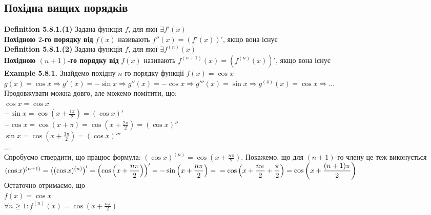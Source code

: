 \documentclass[a4paper, 14pt]{extarticle}
\def\huge{\displaystyle}
\def\bigline{\vspace{5mm}\\}
\def\defin#1{\textbf{Definition {#1}}}
\def\ex#1{\textbf{Example {#1}}}
\def\bigline{\vspace{5mm}\\}
\begin{document}
\subsection{Похідна вищих порядків}
\defin{5.8.1.(1)} Задана функція $f$, для якої $\exists f'(x)$\\
\textbf{Похідною $2$-го порядку від} $f(x)$ називають $f''(x) = (f'(x))'$, якщо вона існує
\bigline
\defin{5.8.1.(2)} Задана функція $f$, для якої $\exists f^{(n)}(x)$\\
\textbf{Похідною $(n+1)$-го порядку від} $f(x)$ називають $f^{(n+1)}(x) = (f^{(n)}(x))'$, якщо вона існує
\bigline
\ex{5.8.1.} Знайдемо похідну $n$-го порядку функції $f(x) = \cos x$\\
$g(x) = \cos x \Rightarrow g'(x) = -\sin x \Rightarrow g''(x) = -\cos x \Rightarrow g'''(x) = \sin x \Rightarrow g^{(4)}(x) = \cos x \Rightarrow \dots$\\
Продовжувати можна довго, але можемо помітити, що:\\
$\cos x = \cos x$\\
$- \sin x = \huge \cos \left(x + \frac{1\pi}{2} \right) = (\cos x)'$\\
$- \cos x = \huge \cos \left(x + \pi \right) = \cos \left(x + \frac{2 \pi}{2} \right) = (\cos x)''$\\
$ \sin x = \huge \cos \left(x + \frac{3\pi}{2} \right) = (\cos x)'''$\\
$\dots$\\
Спробуємо ствердити, що працює формула: $(\cos x)^{(n)} = \huge \cos \left(x + \frac{n\pi}{2} \right)$. Покажемо, що для $(n+1)$-го члену це теж виконується\\
$(\cos x)^{(n+1)} = \left((\cos x)^{(n)}\right)' = \huge \left( \cos \left(x + \frac{n\pi}{2} \right) \right)' = -\sin \left(x + \frac{n\pi}{2} \right) = \\ = \cos \left(x + \frac{n\pi}{2} + \frac{\pi}{2} \right) = \cos \left(x + \frac{(n+1)\pi}{2} \right)$\\
Остаточно отримаємо, що\\
$f(x) = \cos x$\\
$\forall n \geq 1: f^{(n)}(x) = \huge \cos \left(x + \frac{n\pi}{2} \right)$
\bigline
\end{document}
